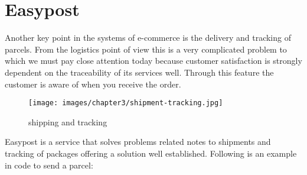 \section{Easypost}
\label{sec:easypost}
Another key point in the systems of e-commerce is the delivery and tracking of parcels. From the logistics point of view this is a very complicated problem to which we must pay close attention today because customer satisfaction is strongly dependent on the traceability of its services well. Through this feature the customer is aware of when you receive the order.
\begin{figure}[htb]
  \centering
  \texttt{[image: images/chapter3/shipment-tracking.jpg]}\hfill
  \caption[shipping and tracking]{shipping and tracking}
\label{fig:shipping_tracking}
\end{figure}
Easypost is a service that solves problems related notes to shipments and tracking of packages offering a solution well established. Following is an example in code to send a parcel:
